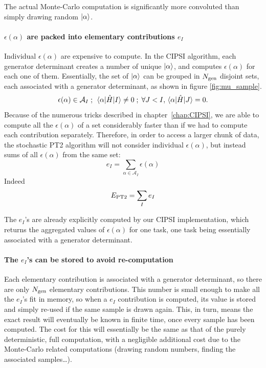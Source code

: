 \documentclass[./thesis.tex]{subfiles}
\begin{document}
The actual Monte-Carlo computation is significantly more convoluted than simply drawing random ${\ket{\alpha}}$.

\paragraph{$\epsilon(\alpha)$ are packed into elementary contributions $e_I$}
Individual $\epsilon(\alpha)$ are expensive to compute. In the CIPSI algorithm, each generator determinant creates a number of unique ${\ket{\alpha}}$, and computes $\epsilon(\alpha)$ for each one of them.
Essentially, the set of ${\ket{\alpha}}$ can be grouped in ${N_\text{gen}}$ disjoint sets, each associated with a generator determinant, as shown in figure \ref{fig:mu_sample}.
\begin{equation}
\epsilon(\alpha) \in \mathcal{A}_I \; ; \; \mel{\alpha}{\hat{H}}{I} \neq 0 \; ; \;   \forall J < I, \mel{\alpha}{\hat{H}}{J} = 0.
\end{equation}
Because of the numerous tricks described in chapter~\ref{chap:CIPSI}, we are able to compute all the $\epsilon(\alpha)$ of a set considerably faster than if we had to compute each contribution separately. Therefore, in order to access a larger chunk of data, the stochastic PT2 algorithm will not consider individual $\epsilon(\alpha)$, but instead sums of all $\epsilon(\alpha)$ from the same set:
\begin{equation}
e_I = \sum_{\alpha \in \mathcal{A}_I} \epsilon(\alpha)
\end{equation}
Indeed
\begin{equation}
E_\text{PT2} = \sum_{I} e_I
\end{equation}

The $e_I$'s are already explicitly computed by our CIPSI implementation, which returns the aggregated values of $\epsilon(\alpha)$ for one task, one task being essentially associated with a generator determinant.

\paragraph{The $e_I$'s can be stored to avoid re-computation}
Each elementary contribution is associated with a generator determinant, so there are only ${N_\text{gen}}$ elementary contributions. This number is small enough to make all the $e_I$'s fit in memory, so when a $e_I$ contribution is computed, its value is stored and simply re-used if the same sample is drawn again. This, in turn, means the exact result will eventually be known in finite time, once every sample has been computed. The cost for this will essentially be the same as that of the purely deterministic, full computation, with a negligible additional cost due to the Monte-Carlo related computations (drawing random numbers, finding the associated samples\dots).
\end{document}
